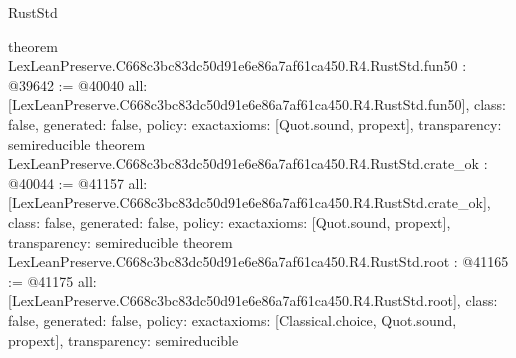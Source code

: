 \begin{lexlean}{RustStd}
\begin{coremodule}
{}
theorem LexLeanPreserve.C668c3bc83dc50d91e6e86a7af61ca450.R4.RustStd.fun50 : @39642 := @40040 {
  all: [LexLeanPreserve.C668c3bc83dc50d91e6e86a7af61ca450.R4.RustStd.fun50],
  class: false,
  generated: false,
  policy: exact{axioms: [Quot.sound, propext]},
  transparency: semireducible
}
theorem LexLeanPreserve.C668c3bc83dc50d91e6e86a7af61ca450.R4.RustStd.crate_ok : @40044 := @41157 {
  all: [LexLeanPreserve.C668c3bc83dc50d91e6e86a7af61ca450.R4.RustStd.crate_ok],
  class: false,
  generated: false,
  policy: exact{axioms: [Quot.sound, propext]},
  transparency: semireducible
}
theorem LexLeanPreserve.C668c3bc83dc50d91e6e86a7af61ca450.R4.RustStd.root : @41165 := @41175 {
  all: [LexLeanPreserve.C668c3bc83dc50d91e6e86a7af61ca450.R4.RustStd.root],
  class: false,
  generated: false,
  policy: exact{axioms: [Classical.choice, Quot.sound, propext]},
  transparency: semireducible
}


\end{coremodule}
\end{lexlean}
